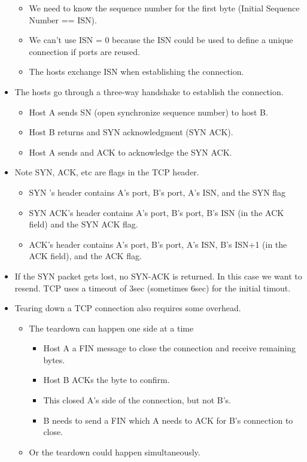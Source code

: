\documentclass[]{article}
\providecommand{\tightlist}{%
  \setlength{\itemsep}{0pt}\setlength{\parskip}{0pt}}
\begin{document}
\begin{itemize}
  \begin{itemize}
  \tightlist
  \item
    We need to know the sequence number for the first byte (Initial
    Sequence Number == ISN).
  \item
    We can't use ISN = 0 because the ISN could be used to define a
    unique connection if ports are reused.
  \item
    The hosts exchange ISN when establishing the connection.
  \end{itemize}
\item
  The hosts go through a three-way handshake to establish the
  connection.

  \begin{itemize}
  \tightlist
  \item
    Host A sends SN (open synchronize sequence number) to host B.
  \item
    Host B returns and SYN acknowledgment (SYN ACK).
  \item
    Host A sends and ACK to acknowledge the SYN ACK.
  \end{itemize}
\item
  Note SYN, ACK, etc are flags in the TCP header.

  \begin{itemize}
  \tightlist
  \item
    SYN 's header contains A's port, B's port, A's ISN, and the SYN flag
  \item
    SYN ACK's header contains A's port, B's port, B's ISN (in the ACK
    field) and the SYN \textbar{} ACK flag.
  \item
    ACK's header contains A's port, B's port, A's ISN, B's ISN+1 (in the
    ACK field), and the ACK flag.
  \end{itemize}
\item
  If the SYN packet gets lost, no SYN-ACK is returned. In this case we
  want to resend. TCP uses a timeout of 3sec (sometimes 6sec) for the
  initial timout.
\item
  Tearing down a TCP connection also requires some overhead.

  \begin{itemize}
  \tightlist
  \item
    The teardown can happen one side at a time

    \begin{itemize}
    \tightlist
    \item
      Host A a FIN message to close the connection and receive remaining
      bytes.
    \item
      Host B ACKs the byte to confirm.
    \item
      This closed A's side of the connection, but not B's.
    \item
      B needs to send a FIN which A needs to ACK for B's connection to
      close.
    \end{itemize}
  \item
    Or the teardown could happen simultaneously.


\end{itemize}
\end{itemize}
\end{document}
